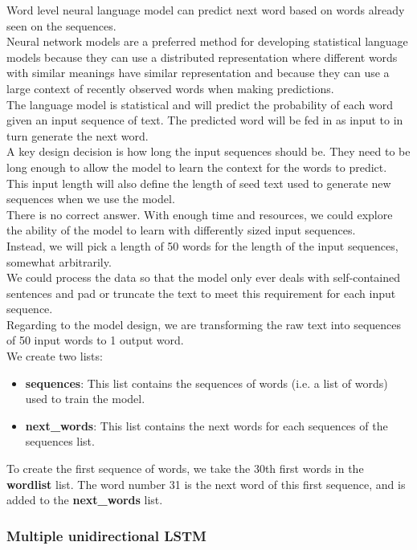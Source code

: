 \documentclass[conference]{IEEEtran}
\begin{document}
Word level neural language model can predict next word based on words already seen on the sequences.\\
Neural network models are a preferred method for developing statistical language models because they can use a distributed representation where different words with similar meanings have similar representation and because they can use a large context of recently observed words when making predictions.\\
The language model is statistical and will predict the probability of each word given an input sequence of text. The predicted word will be fed in as input to in turn generate the next word.\\
A key design decision is how long the input sequences should be. They need to be long enough to allow the model to learn the context for the words to predict. This input length will also define the length of seed text used to generate new sequences when we use the model.\\
There is no correct answer. With enough time and resources, we could explore the ability of the model to learn with differently sized input sequences.\\
Instead, we will pick a length of 50 words for the length of the input sequences, somewhat arbitrarily.\\
We could process the data so that the model only ever deals with self-contained sentences and pad or truncate the text to meet this requirement for each input sequence.\\
Regarding to the model design, we are transforming the raw text into sequences of 50 input words to 1 output word.\\

We create two lists:

\begin{itemize}
\item \textbf{sequences}: This list contains the sequences of words (i.e. a list of words) used to train the model.
\item \textbf{next\_words}: This list contains the next words for each sequences of the sequences list.
\end{itemize}

To create the first sequence of words, we take the 30th first words in the \textbf{wordlist} list. The word number 31 is the next word of this first sequence, and is added to the \textbf{next\_words} list.

\subsubsection{Multiple unidirectional LSTM}\label{subsec_embedding_layer}
\end{document}
